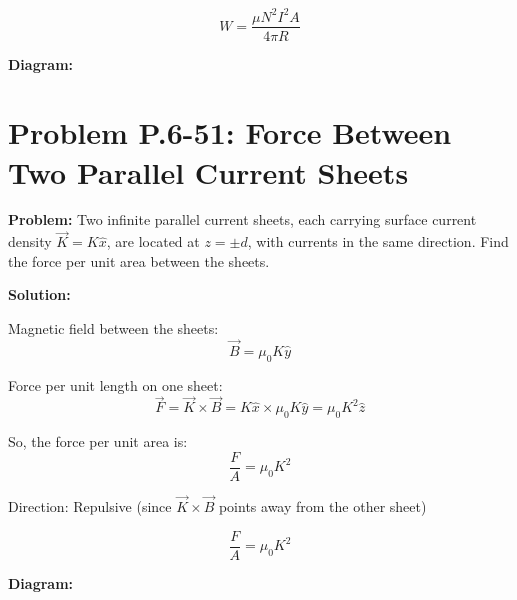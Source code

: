 \documentclass[12pt]{article}
\begin{document}
\begin{tcolorbox}
\[
\boxed{W = \frac{\mu N^2 I^2 A}{4\pi R}}
\]
\end{tcolorbox}

\textbf{Diagram:}
\begin{center}
\end{center}



\section*{Problem P.6-51: Force Between Two Parallel Current Sheets}

\textbf{Problem:}  
Two infinite parallel current sheets, each carrying surface current density \( \vec{K} = K \hat{x} \), are located at \( z = \pm d \), with currents in the same direction. Find the force per unit area between the sheets.

\textbf{Solution:}

Magnetic field between the sheets:
\[
\vec{B} = \mu_0 K \hat{y}
\]

Force per unit length on one sheet:
\[
\vec{F} = \vec{K} \times \vec{B} = K \hat{x} \times \mu_0 K \hat{y} = \mu_0 K^2 \hat{z}
\]

So, the force per unit area is:
\[
\frac{F}{A} = \mu_0 K^2
\]

Direction: Repulsive (since \( \vec{K} \times \vec{B} \) points away from the other sheet)

\begin{tcolorbox}
\[
\boxed{\frac{F}{A} = \mu_0 K^2}
\]
\end{tcolorbox}

\textbf{Diagram:}
\begin{center}
\end{center}
\end{document}

